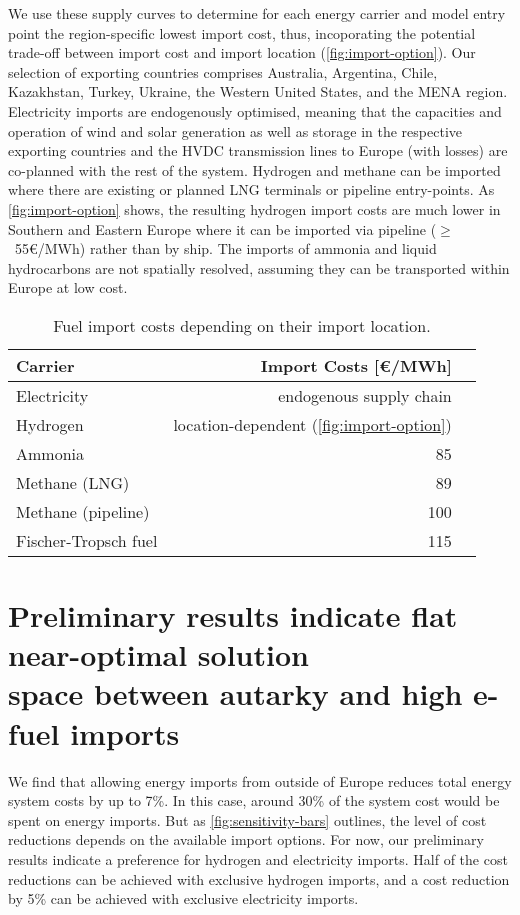 \documentclass[10pt,5p,reversenotenum,lefttitle]{elsarticle}
\begin{document}
We use these supply curves to determine for each energy carrier and model entry
point the region-specific lowest import cost, thus, incoporating the potential
trade-off between import cost and import location (\cref{fig:import-option}).
Our selection of exporting countries comprises Australia, Argentina, Chile,
Kazakhstan, Turkey, Ukraine, the Western United States, and the MENA region.
Electricity imports are endogenously optimised, meaning that the capacities and
operation of wind and solar generation as well as storage in the respective
exporting countries and the HVDC transmission lines to Europe (with losses) are
co-planned with the rest of the system. Hydrogen and methane can be imported
where there are existing or planned LNG terminals or pipeline entry-points. As
\cref{fig:import-option} shows, the resulting hydrogen import costs are much
lower in Southern and Eastern Europe where it can be imported via pipeline
\mbox{($\geq$ 55\euro/MWh)} rather than by ship. The imports of ammonia and
liquid hydrocarbons are not spatially resolved, assuming they can be transported
within Europe at low cost.

\begin{table}
    \caption{Fuel import costs depending on their import location.}
    \label{tab:costs}
    \centering\small
    \begin{tabular}[pos]{lrr}
        \toprule
        Carrier & Import Costs [\euro/MWh] \\
        \midrule
        Electricity & endogenous supply chain \\
        Hydrogen & location-dependent (\cref{fig:import-option}) \\
        Ammonia & 85 \\
        Methane (LNG) & 89 \\
        Methane (pipeline) & 100 \\
        Fischer-Tropsch fuel & 115 \\
        \bottomrule
    \end{tabular}
\end{table}

\section*{Preliminary results indicate flat near-optimal solution\\space between autarky and high e-fuel imports}

We find that allowing energy imports from outside of Europe reduces total energy
system costs by up to 7\%. In this case, around 30\% of the system cost would be
spent on energy imports. But as \cref{fig:sensitivity-bars} outlines, the level
of cost reductions depends on the available import options. For now, our
preliminary results indicate a preference for hydrogen and electricity imports.
Half of the cost reductions can be achieved with exclusive hydrogen imports, and
a cost reduction by 5\% can be achieved with exclusive electricity imports.
\end{document}
